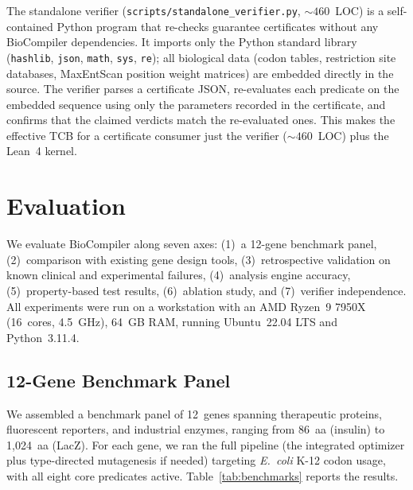\documentclass[acmsmall,review,anonymous]{acmart}
\begin{document}
The standalone verifier (\texttt{scripts/standalone\_verifier.py}, ${\sim}460$~LOC) is a
self-contained Python program that re-checks guarantee certificates
without any BioCompiler dependencies.  It imports only the Python
standard library (\texttt{hashlib}, \texttt{json}, \texttt{math},
\texttt{sys}, \texttt{re}); all biological data (codon tables,
restriction site databases, MaxEntScan position weight matrices) are
embedded directly in the source.  The verifier parses a certificate JSON,
re-evaluates each predicate on the embedded sequence using only the
parameters recorded in the certificate, and confirms that the claimed
verdicts match the re-evaluated ones.  This makes the effective TCB for a
certificate consumer just the verifier (${\sim}460$~LOC) plus the
Lean~4 kernel.


\section{Evaluation}\label{sec:eval}

We evaluate BioCompiler along seven axes: (1)~a 12-gene benchmark panel,
(2)~comparison with existing gene design tools, (3)~retrospective
validation on known clinical and experimental failures, (4)~analysis
engine accuracy, (5)~property-based test results, (6)~ablation study,
and (7)~verifier independence.  All experiments were run on a
workstation with an AMD Ryzen~9 7950X (16~cores, 4.5~GHz), 64~GB RAM,
running Ubuntu~22.04 LTS and Python~3.11.4.

\subsection{12-Gene Benchmark Panel}\label{sec:benchmark}

We assembled a benchmark panel of 12~genes spanning therapeutic proteins,
fluorescent reporters, and industrial enzymes, ranging from 86~aa
(insulin) to 1,024~aa (LacZ).  For each gene, we ran the full pipeline
(the integrated optimizer plus type-directed mutagenesis if needed) targeting
\emph{E.~coli} K-12 codon usage, with all eight core predicates active.
Table~\ref{tab:benchmarks} reports the results.
\end{document}
